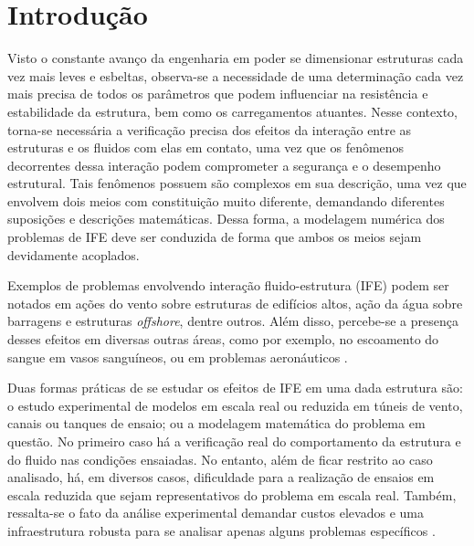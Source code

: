 \chapter{Introdução}


Visto o constante avanço da engenharia em poder se dimensionar estruturas cada vez mais leves e esbeltas, observa-se a necessidade de uma determinação cada vez mais precisa de todos os parâmetros que podem influenciar na resistência e estabilidade da estrutura, bem como os carregamentos atuantes. Nesse contexto, torna-se necessária a verificação precisa dos efeitos da interação entre as estruturas e os fluidos com elas em contato, uma vez que os fenômenos decorrentes dessa interação podem comprometer a segurança e o desempenho estrutural. Tais fenômenos possuem são complexos em sua descrição, uma vez que envolvem dois meios com constituição muito diferente, demandando diferentes suposições e descrições matemáticas. Dessa forma, a modelagem numérica dos problemas de IFE deve ser conduzida de forma que ambos os meios sejam devidamente acoplados.

Exemplos de problemas envolvendo interação fluido-estrutura (IFE) podem ser notados em ações do vento sobre estruturas de edifícios altos, ação da água sobre barragens e estruturas \textit{offshore}, dentre outros. Além disso, percebe-se a presença desses efeitos em diversas outras áreas, como por exemplo, no escoamento do sangue em vasos sanguíneos, ou em problemas aeronáuticos \cite{sanches2014fluid, fernandes2020tecnica}.

Duas formas práticas de se estudar os efeitos de IFE em uma dada estrutura são: o estudo experimental de modelos em escala real ou reduzida em túneis de vento, canais ou tanques de ensaio; ou a modelagem matemática do problema em questão. No primeiro caso há a verificação real do comportamento da estrutura e do fluido nas condições ensaiadas. No entanto, além de ficar restrito ao caso analisado, há, em diversos casos, dificuldade para a realização de ensaios em escala reduzida que sejam representativos do problema em escala real. Também, ressalta-se o fato da análise experimental demandar custos elevados e uma infraestrutura robusta para se analisar apenas alguns problemas específicos \cite{fernandes2020tecnica}.

